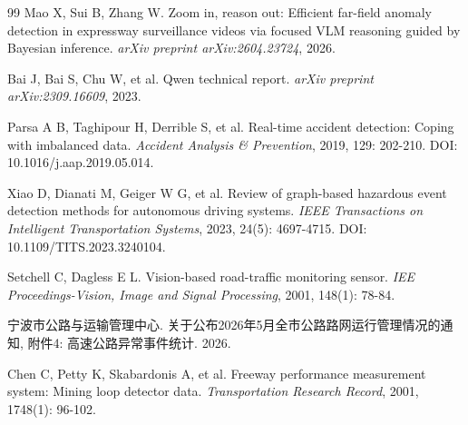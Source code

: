 \documentclass[10.5pt,a4paper,twoside,twocolumn]{ctexart}
\begin{document}
\begin{thebibliography}{99}
Mao X, Sui B, Zhang W.
Zoom in, reason out: Efficient far-field anomaly detection in expressway surveillance videos via focused VLM reasoning guided by Bayesian inference.
\emph{arXiv preprint arXiv:2604.23724}, 2026.

Bai J, Bai S, Chu W, et al.
Qwen technical report.
\emph{arXiv preprint arXiv:2309.16609}, 2023.

Parsa A B, Taghipour H, Derrible S, et al.
Real-time accident detection: Coping with imbalanced data.
\emph{Accident Analysis \& Prevention}, 2019, 129: 202-210.
DOI: 10.1016/j.aap.2019.05.014.

Xiao D, Dianati M, Geiger W G, et al.
Review of graph-based hazardous event detection methods for autonomous driving systems.
\emph{IEEE Transactions on Intelligent Transportation Systems}, 2023, 24(5): 4697-4715.
DOI: 10.1109/TITS.2023.3240104.

Setchell C, Dagless E L.
Vision-based road-traffic monitoring sensor.
\emph{IEE Proceedings-Vision, Image and Signal Processing}, 2001, 148(1): 78-84.

宁波市公路与运输管理中心.
关于公布2026年5月全市公路路网运行管理情况的通知, 附件4: 高速公路异常事件统计.
2026.

Chen C, Petty K, Skabardonis A, et al.
Freeway performance measurement system: Mining loop detector data.
\emph{Transportation Research Record}, 2001, 1748(1): 96-102.

\end{thebibliography}
\end{document}
